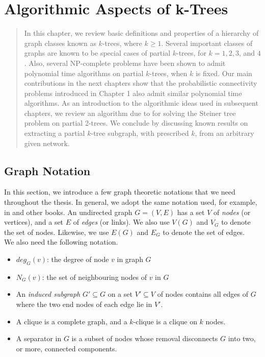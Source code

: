 \chapter{Algorithmic Aspects of k-Trees}

\begin{quotation}
In this chapter, we review basic definitions and properties of a hierarchy of graph classes known as $k$-trees, where $k\geq 1$. Several important classes of graphs are known to be special cases of partial $k$-trees, for $k=1,2,3$, and $4$. Also, several NP-complete problems have been shown to admit polynomial time algorithms on partial $k$-trees, when $k$ is fixed. Our main contributions in the next chapters show that the probabilistic connectivity problems introduced in Chapter 1 also admit similar polynomial time algorithms. As an introduction to the algorithmic ideas used in subsequent chapters, we review an algorithm due to \cite{wald1983steiner} for solving the Steiner tree problem on partial 2-trees. We conclude by discussing known results on extracting a partial $k$-tree subgraph, with prescribed $k$, from an arbitrary given network.
\end{quotation}

\section{Graph Notation}
\label{sec:graphNotation}

In this section, we introduce a few graph theoretic notations that we need throughout the thesis. In general, we adopt the same notation used, for example, in \cite{cormen2001introduction} and other books. 
An undirected graph $G=(V,E)$ has a set $V$ of \textit{nodes} (or vertices), and a set $E$ of \textit{edges} (or links).
We also use $V(G)$ and $V_G$ to denote the set of nodes. Likewise, we use $E(G)$ and $E_G$ to denote the set of edges. \\
We also need the following notation.
\begin{itemize}[noitemsep]
\item $deg_G(v)$: the degree of node $v$ in graph $G$
\item $N_G(v)$: the set of neighbouring nodes of $v$ in $G$
\item An \textit{induced subgraph} $G'\subseteq G$ on a set $V'\subseteq V$ of nodes contains all edges of $G$ where the two end nodes of each edge lie in $V'$.
\item A clique is a complete graph, and a $k$-clique is a clique on $k$ nodes.
\item A separator in $G$ is a subset of nodes whose removal disconnects $G$ into two, or more, connected components.
\end{itemize}


